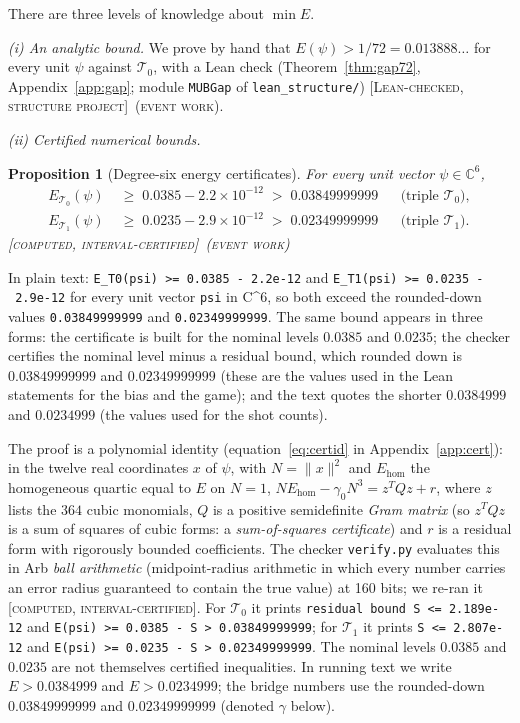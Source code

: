 \documentclass[11pt]{article}
\newcommand{\C}{\mathbb{C}}
\newcommand{\norm}[1]{\lVert #1\rVert}
\newcommand{\Tz}{\mathcal{T}_0}          %
\newcommand{\To}{\mathcal{T}_1}          %
\newcommand{\E}{E}                       %
\newcommand{\st}[1]{\textsc{[#1]}}
\newcommand{\stlean}{\st{Lean-checked, structure project}}
\newcommand{\stcert}{\st{computed, interval-certified}}
\newcommand{\event}{\textsc{(event work)}}
\newtheorem{proposition}[theorem]{Proposition}
\theoremstyle{definition}
\theoremstyle{remark}
\begin{document}
There are three levels of knowledge about $\min\E$.

\emph{(i) An analytic bound.} We prove by hand that $\E(\psi)>1/72=0.013888\ldots$ for every unit $\psi$
against $\Tz$, with a Lean check (Theorem~\ref{thm:gap72}, Appendix~\ref{app:gap}; module
\texttt{MUBGap} of \texttt{lean\_structure/}) \stlean\ \event.

\emph{(ii) Certified numerical bounds.}

\begin{proposition}[Degree-six energy certificates]\label{prop:cert6}
For every unit vector $\psi\in\C^6$,
\begin{align*}
  \E_{\Tz}(\psi)&\;\ge\;0.0385-2.2\times10^{-12}\;>\;0.03849999999 &&\text{(triple $\Tz$)},\\
  \E_{\To}(\psi)&\;\ge\;0.0235-2.9\times10^{-12}\;>\;0.02349999999 &&\text{(triple $\To$)}.
\end{align*}
\stcert\ \event
\end{proposition}

{\raggedright In plain text: \texttt{E\_T0(psi) >= 0.0385 -~2.2e-12} and \texttt{E\_T1(psi) >= 0.0235 -~2.9e-12} for every unit vector
\texttt{psi} in C\textasciicircum6, so both exceed the rounded-down values \texttt{0.03849999999} and \texttt{0.02349999999}.
The same bound appears in three forms: the certificate is built for the nominal levels $0.0385$ and $0.0235$; the
checker certifies the nominal level minus a residual bound, which rounded down is $0.03849999999$ and
$0.02349999999$ (these are the values used in the Lean statements for the bias and the game); and the text quotes
the shorter $0.0384999$ and $0.0234999$ (the values used for the shot counts).\par}

The proof is a polynomial identity (equation~\eqref{eq:certid} in Appendix~\ref{app:cert}): in the twelve real
coordinates $x$ of $\psi$, with $N=\norm x^2$ and $\E_{\mathrm{hom}}$ the homogeneous quartic equal to $\E$ on $N=1$,
$N\E_{\mathrm{hom}}-\gamma_0N^3=z^{T}Qz+r$, where $z$ lists the $364$ cubic monomials, $Q$ is a positive semidefinite
\emph{Gram matrix} (so $z^{T}Qz$ is a sum of squares of cubic forms: a \emph{sum-of-squares certificate}) and $r$ is a
residual form with rigorously bounded coefficients. The checker \texttt{verify.py} evaluates this in Arb \emph{ball
arithmetic} (midpoint-radius arithmetic in which every number carries an error radius guaranteed to contain the true
value) at 160 bits; we re-ran it \stcert. For $\Tz$ it prints \texttt{residual bound S <= 2.189e-12} and
\texttt{E(psi) >= 0.0385 -~S > 0.03849999999}; for $\To$ it prints \texttt{S <= 2.807e-12} and
\texttt{E(psi) >= 0.0235 -~S > 0.02349999999}. The nominal levels $0.0385$ and $0.0235$ are not themselves certified
inequalities. In running text we write $\E>0.0384999$ and $\E>0.0234999$; the bridge numbers use the rounded-down
$0.03849999999$ and $0.02349999999$ (denoted $\gamma$ below).
\end{document}
